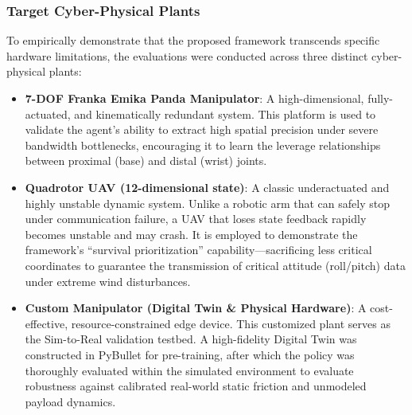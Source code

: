 \subsubsection{Target Cyber-Physical Plants}
To empirically demonstrate that the proposed framework transcends specific hardware limitations, the evaluations were conducted across three distinct cyber-physical plants:
\begin{itemize}
    \item \textbf{7-DOF Franka Emika Panda Manipulator}: A high-dimensional, fully-actuated, and kinematically redundant system. This platform is used to validate the agent's ability to extract high spatial precision under severe bandwidth bottlenecks, encouraging it to learn the leverage relationships between proximal (base) and distal (wrist) joints.
    \item \textbf{Quadrotor UAV (12-dimensional state)}: A classic underactuated and highly unstable dynamic system. Unlike a robotic arm that can safely stop under communication failure, a UAV that loses state feedback rapidly becomes unstable and may crash. It is employed to demonstrate the framework's ``survival prioritization'' capability---sacrificing less critical coordinates to guarantee the transmission of critical attitude (roll/pitch) data under extreme wind disturbances.
    \item \textbf{Custom Manipulator (Digital Twin \& Physical Hardware)}: A cost-effective, resource-constrained edge device. This customized plant serves as the Sim-to-Real validation testbed. A high-fidelity Digital Twin was constructed in PyBullet for pre-training, after which the policy was thoroughly evaluated within the simulated environment to evaluate robustness against calibrated real-world static friction and unmodeled payload dynamics.
\end{itemize}
